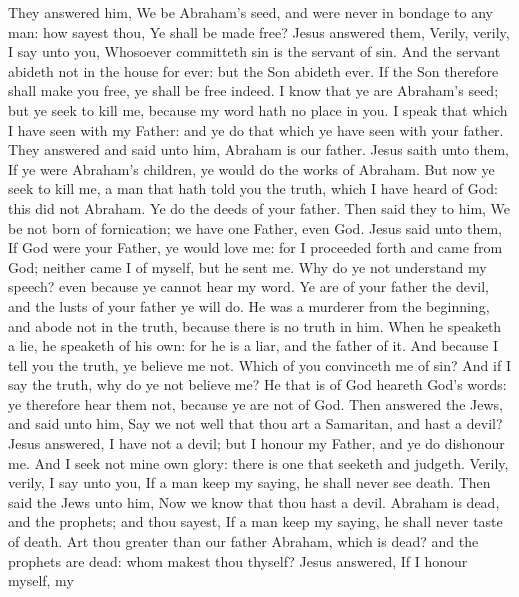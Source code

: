  They answered him, We be Abraham's seed, and were never
in bondage to any man: how sayest thou, Ye shall be made free?
 Jesus answered them, Verily, verily, I say unto you,
Whosoever committeth sin is the servant of sin.  And the
servant abideth not in the house for ever: but the Son abideth ever.
 If the Son therefore shall make you free, ye shall be
free indeed.  I know that ye are Abraham's seed; but ye
seek to kill me, because my word hath no place in you.  I
speak that which I have seen with my Father: and ye do that which ye
have seen with your father.  They answered and said unto
him, Abraham is our father. Jesus saith unto them, If ye were Abraham's
children, ye would do the works of Abraham.  But now ye
seek to kill me, a man that hath told you the truth, which I have heard
of God: this did not Abraham.  Ye do the deeds of your
father. Then said they to him, We be not born of fornication; we have
one Father, even God.  Jesus said unto them, If God were
your Father, ye would love me: for I proceeded forth and came from God;
neither came I of myself, but he sent me.  Why do ye not
understand my speech? even because ye cannot hear my word.
 Ye are of your father the devil, and the lusts of your
father ye will do. He was a murderer from the beginning, and abode not
in the truth, because there is no truth in him. When he speaketh a lie,
he speaketh of his own: for he is a liar, and the father of it.
 And because I tell you the truth, ye believe me not.
 Which of you convinceth me of sin? And if I say the
truth, why do ye not believe me?  He that is of God
heareth God's words: ye therefore hear them not, because ye are not of
God.  Then answered the Jews, and said unto him, Say we
not well that thou art a Samaritan, and hast a devil? 
Jesus answered, I have not a devil; but I honour my Father, and ye do
dishonour me.  And I seek not mine own glory: there is
one that seeketh and judgeth.  Verily, verily, I say unto
you, If a man keep my saying, he shall never see death. 
Then said the Jews unto him, Now we know that thou hast a devil. Abraham
is dead, and the prophets; and thou sayest, If a man keep my saying, he
shall never taste of death.  Art thou greater than our
father Abraham, which is dead? and the prophets are dead: whom makest
thou thyself?  Jesus answered, If I honour myself, my

